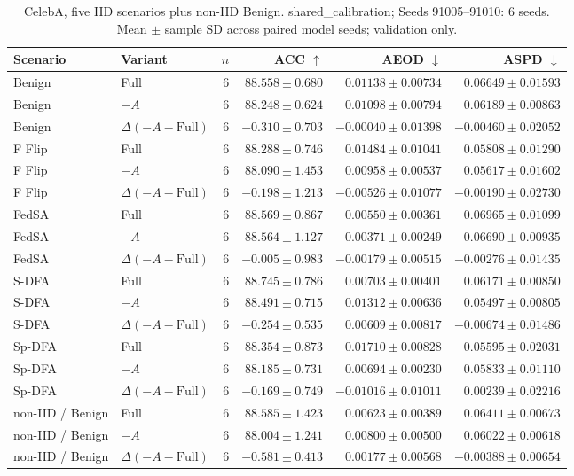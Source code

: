 \begin{table}[t]
\centering
\small
\caption{CelebA, five IID scenarios plus non-IID Benign. shared\_calibration; Seeds 91005–91010: 6 seeds. Mean $\pm$ sample SD across paired model seeds; validation only.}
\begin{tabular}{llrrrr}
\toprule
Scenario & Variant & $n$ & ACC $\uparrow$ & AEOD $\downarrow$ & ASPD $\downarrow$ \\
\midrule
Benign & Full & 6 & $88.558 \pm 0.680$ & $0.01138 \pm 0.00734$ & $0.06649 \pm 0.01593$ \\
Benign & $-A$ & 6 & $88.248 \pm 0.624$ & $0.01098 \pm 0.00794$ & $0.06189 \pm 0.00863$ \\
Benign & $\Delta(-A-\mathrm{Full})$ & 6 & $-0.310 \pm 0.703$ & $-0.00040 \pm 0.01398$ & $-0.00460 \pm 0.02052$ \\
F Flip & Full & 6 & $88.288 \pm 0.746$ & $0.01484 \pm 0.01041$ & $0.05808 \pm 0.01290$ \\
F Flip & $-A$ & 6 & $88.090 \pm 1.453$ & $0.00958 \pm 0.00537$ & $0.05617 \pm 0.01602$ \\
F Flip & $\Delta(-A-\mathrm{Full})$ & 6 & $-0.198 \pm 1.213$ & $-0.00526 \pm 0.01077$ & $-0.00190 \pm 0.02730$ \\
FedSA & Full & 6 & $88.569 \pm 0.867$ & $0.00550 \pm 0.00361$ & $0.06965 \pm 0.01099$ \\
FedSA & $-A$ & 6 & $88.564 \pm 1.127$ & $0.00371 \pm 0.00249$ & $0.06690 \pm 0.00935$ \\
FedSA & $\Delta(-A-\mathrm{Full})$ & 6 & $-0.005 \pm 0.983$ & $-0.00179 \pm 0.00515$ & $-0.00276 \pm 0.01435$ \\
S-DFA & Full & 6 & $88.745 \pm 0.786$ & $0.00703 \pm 0.00401$ & $0.06171 \pm 0.00850$ \\
S-DFA & $-A$ & 6 & $88.491 \pm 0.715$ & $0.01312 \pm 0.00636$ & $0.05497 \pm 0.00805$ \\
S-DFA & $\Delta(-A-\mathrm{Full})$ & 6 & $-0.254 \pm 0.535$ & $0.00609 \pm 0.00817$ & $-0.00674 \pm 0.01486$ \\
Sp-DFA & Full & 6 & $88.354 \pm 0.873$ & $0.01710 \pm 0.00828$ & $0.05595 \pm 0.02031$ \\
Sp-DFA & $-A$ & 6 & $88.185 \pm 0.731$ & $0.00694 \pm 0.00230$ & $0.05833 \pm 0.01110$ \\
Sp-DFA & $\Delta(-A-\mathrm{Full})$ & 6 & $-0.169 \pm 0.749$ & $-0.01016 \pm 0.01011$ & $0.00239 \pm 0.02216$ \\
non-IID / Benign & Full & 6 & $88.585 \pm 1.423$ & $0.00623 \pm 0.00389$ & $0.06411 \pm 0.00673$ \\
non-IID / Benign & $-A$ & 6 & $88.004 \pm 1.241$ & $0.00800 \pm 0.00500$ & $0.06022 \pm 0.00618$ \\
non-IID / Benign & $\Delta(-A-\mathrm{Full})$ & 6 & $-0.581 \pm 0.413$ & $0.00177 \pm 0.00568$ & $-0.00388 \pm 0.00654$ \\
\bottomrule
\end{tabular}
\end{table}

